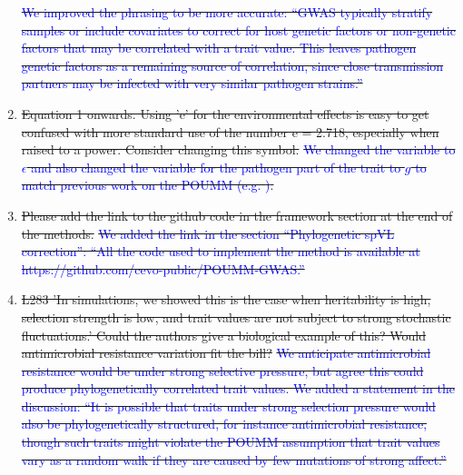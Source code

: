 \documentclass[12pt]{article} %
\providecommand{\DIFdel}[1]{{\protect\color{red}\sout{#1}}}                      %
\providecommand{\DIFdelend}{} %
\DeclareRobustCommand{\DIFdelend}{\DIFOaddend \let\includegraphics\DIFOincludegraphics} %
\begin{document}
\begin{enumerate}
\DIFdel{\textcolor{blue}{We improved the phrasing to be more accurate: ``GWAS typically stratify samples or include covariates to correct for host genetic factors or non-genetic factors that may be correlated with a trait value. This leaves pathogen genetic factors as a remaining source of correlation, since close transmission partners may be infected with very similar pathogen strains.''}
    }%
\item%
\DIFdel{Equation 1 onwards. Using 'e' for the environmental effects is easy to get confused with more standard use of the number e = 2.718, especially when raised to a power. Consider changing this symbol.}%
\DIFdel{\textcolor{blue}{We changed the variable to $\epsilon$ and also changed the variable for the pathogen part of the trait to $g$ to match previous work on the POUMM (e.g. \citep{Mitov2017a-POUMM})}.
    }%
\item%
\DIFdel{Please add the link to the github code in the framework section at the end of the methods.}%
\DIFdel{\textcolor{blue}{We added the link in the section ``Phylogenetic spVL correction'': ``All the code used to implement the method is available at https://github.com/cevo-public/POUMM-GWAS.''}
    }%
\item%
\DIFdel{L283 'In simulations, we showed this is the case when heritability is high, selection strength is low, and trait values are not subject to strong stochastic fluctuations.' Could the authors give a biological example of this? Would antimicrobial resistance variation fit the bill?}%
\DIFdel{\textcolor{blue}{We anticipate antimicrobial resistance would be under strong selective pressure, but agree this could produce phylogenetically correlated trait values. We added a statement in the discussion: ``It is possible that traits under strong selection pressure would also be phylogenetically structured, for instance antimicrobial resistance, though such traits might violate the POUMM assumption that trait values vary as a random walk if they are caused by few mutations of strong affect.''}
}
\end{enumerate}%
\DIFdelend
\end{document}
